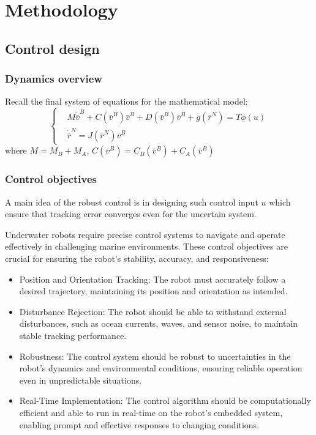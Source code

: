 \chapter{Methodology}
\label{chap:ctrl}





\section{Control design}

\subsection{Dynamics overview}

Recall the final system of equations for the mathematical model:
$$
    \begin{cases}
         & M \dot{\bar{v}}^B + C(\bar{v}^B) \bar{v}^B+D(\bar{v}^B) \bar{v}^B+g(\bar{r}^N)= T\phi(u) \\
         & \dot{\bar{r}}^N=J(\bar{r}^N) \bar{v}^B
    \end{cases}
$$
where
$M=M_B+M_A$, $C(\bar{v}^B)=C_B(\bar{v}^B)+C_A(\bar{v}^B)$

\subsection{Control objectives}

A main idea of the robust control is in designing such control input $u$ which ensure 
that tracking error converges even for the uncertain system.

Underwater robots require precise control systems to navigate and operate effectively
in challenging marine environments. These control objectives are crucial for ensuring
the robot's stability, accuracy, and responsiveness:
\begin{itemize}
    \item Position and Orientation Tracking:
          The robot must accurately follow a desired trajectory, maintaining its position
          and orientation as intended.
    \item Disturbance Rejection:
          The robot should be able to withstand external disturbances, such as ocean
          currents, waves, and sensor noise, to maintain stable tracking performance.
    \item Robustness:
          The control system should be robust to uncertainties in the robot's dynamics
          and environmental conditions, ensuring reliable operation even in unpredictable
          situations.
    \item Real-Time Implementation:
          The control algorithm should be computationally efficient and able to run in
          real-time on the robot's embedded system, enabling prompt and effective
          responses to changing conditions.
\end{itemize}

